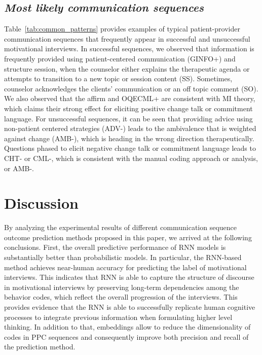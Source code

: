 \documentclass{amia_summit_2018}
\begin{document}
\subsection*{\textit{Most likely communication sequences}}
Table~\ref{tab:common_patterns} provides examples of typical patient-provider communication sequences that frequently appear in successful and unsuccessful motivational interviews. In successful
sequences, we observed that information is frequently provided using patient-centered communication (GINFO+) and structure session, when the counselor either explains the therapeutic agenda or
attempts to transition to a new topic or session content (SS). Sometimes, counselor acknowledges the clients' communication or an off topic comment (SO). We also observed that the affirm and OQECML+
are consistent with MI theory, which claims their strong effect for eliciting positive change talk or commitment language. For unsuccessful sequences, it can be seen that providing advice using
non-patient centered strategies (ADV-) leads to the ambivalence that is weighted against change (AMB-), which is heading in the wrong direction therapeutically. Questions phased to elicit negative
change talk or commitment language leads to CHT- or CML-, which is  consistent with the manual coding approach or analysis, or AMB-.

\section*{Discussion}
By analyzing the experimental results of different communication sequence outcome prediction methods proposed in this paper, we arrived at the following conclusions. First, the overall predictive
performance of RNN models is substantially better than probabilistic models. In particular, the RNN-based method achieves near-human accuracy for predicting the label of motivational interviews. This
indicates that RNN is able to capture the structure of discourse in motivational interviews by preserving long-term dependencies among the behavior codes, which reflect the overall progression of the
interviews. This provides evidence that the RNN is able to successfully replicate human cognitive processes to integrate previous information when formulating higher level thinking. In addition to
that, embeddings allow to reduce the dimensionality of codes in PPC sequences and consequently improve both precision and recall of the prediction method.
\end{document}
